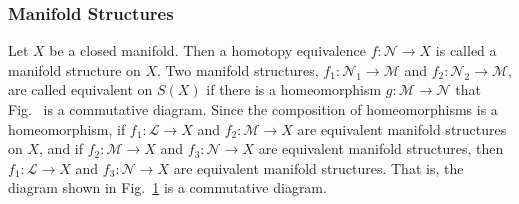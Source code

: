 \documentclass[crop=false,class=book,oneside]{standalone}                      %
\begin{document}
        \subsubsection{Manifold Structures}
            Let $X$ be a closed manifold. Then a homotopy
            equivalence $f:\mathcal{N}\rightarrow{X}$ is called a
            manifold structure on $X$. Two manifold structures,
            $f_{1}:\mathcal{N}_{1}\rightarrow{\mathcal{M}}$ and
            $f_{2}:\mathcal{N}_{2}\rightarrow{\mathcal{M}}$, are called
            equivalent on $S(X)$ if there is a homeomorphism
            $g:\mathcal{M}\rightarrow\mathcal{N}$ that
            Fig.~ is a
            commutative diagram. Since the composition of homeomorphisms
            is a homeomorphism, if $f_{1}:\mathcal{L}\rightarrow{X}$ and
            $f_{2}:\mathcal{M}\rightarrow{X}$ are equivalent manifold structures
            on $X$, and if $f_{2}:\mathcal{M}\rightarrow{X}$
            and $f_{3}:\mathcal{N}\rightarrow{X}$ are equivalent
            manifold structures, then $f_{1}:\mathcal{L}\rightarrow{X}$
            and $f_{3}:\mathcal{N}\rightarrow{X}$ are equivalent manifold
            structures. That is, the diagram shown in
            Fig.~\ref{fig:Equivalent_Manifold_Structure_Diagram} is a
            commutative diagram.
            \begin{figure}[H]
                \captionsetup{type=figure}
                \begin{subfigure}[b]{0.49\textwidth}
                    \centering
                    \captionsetup{type=figure}
                    
                    \label{fig:Equivalent_Manifold_Structure_Diagram}
                \end{subfigure}
                \begin{subfigure}[b]{0.49\textwidth}
                    \centering
                    \captionsetup{type=figure}
                    
                    \label{fig:Equivalent_Manifold_Structure_%
                           Diagram_Equivalence_Relation}
                \end{subfigure}
                \label{Commutative Diagrams for Manifold Structures.}
                \label{fig:Commutative_Diagrams_for_Manifold_Structures}
            \end{figure}
\end{document}
